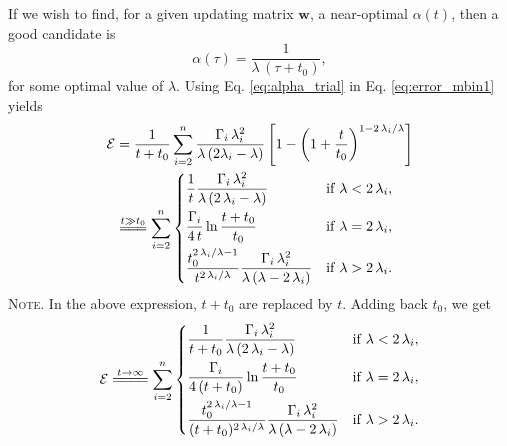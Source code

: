 \documentclass[reprint]{revtex4-1}
\newcommand{\note}[1]{{\color{DarkGreen}\footnotesize \textsc{Note.} #1}}
\begin{document}
If we wish to find,
for a given updating matrix $\mathbf w$,
a near-optimal $\alpha(t)$,
%
then a good candidate is
%
\begin{equation}
\alpha(\tau) = \frac{1}{\lambda \, (\tau + t_0) },
\label{eq:alpha_trial}
\end{equation}
%
for some optimal value of $\lambda$.
%
Using Eq. \eqref{eq:alpha_trial}
in Eq. \eqref{eq:error_mbin1} yields
%
\begin{align}
\mathcal E
&=
\frac{1}{t+t_0}
\sum_{i=2}^n
  \frac{       \Gamma_i \, \lambda_i^2      }
       { \lambda \, (2 \lambda_i - \lambda) }
\left[
  1 - \left(
        1 + \frac{ t }{ t_0 }
      \right)^{1 - 2 \, \lambda_i/\lambda}
\right]
\notag
\\
&\stackrel{      t \gg t_0      }
          { =\joinrel=\joinrel= }
%
\sum_{i = 2}^n
\begin{dcases}
  \frac{ 1 }
       { t }
  \frac{         \Gamma_i \, \lambda_i^2       }
       { \lambda \, (2 \, \lambda_i - \lambda) }
  &
  \mathrm{if \;} \lambda < 2 \, \lambda_i,
  \\%
  \frac{ \Gamma_i }
       {  4 \, t  }
  \ln \frac{ t + t_0 }
           {  t_0    }
  &
  \mathrm{if \;} \lambda = 2 \, \lambda_i,
  \\%
  \frac{ t_0^{ 2 \, \lambda_i / \lambda  - 1 } }
       {   t^{ 2 \, \lambda_i / \lambda      } }
  \frac{      \Gamma_i \, \lambda_i^2          }
       { \lambda \, (\lambda - 2 \, \lambda_i) }
  &
  \mathrm{if \;} \lambda > 2 \, \lambda_i.
\end{dcases}
\label{eq:y2_sum_perfect_invt}
\end{align}
%
\note{In the above expression,
$t + t_0$ are replaced by $t$.
%
Adding back $t_0$, we get
$$
\begin{aligned}
  \mathcal E
  \stackrel{         t \to \infty         }
           { =\joinrel=\joinrel=\joinrel= }
  \sum_{i = 2}^n
  \begin{dcases}
    \frac{    1    }
         { t + t_0 }
    \frac{       \Gamma_i \, \lambda_i^2         }
         { \lambda \, (2 \, \lambda_i - \lambda) }
    &
    \mathrm{if \;} \lambda < 2 \, \lambda_i,
    \\%
    \frac{    \Gamma_i    }
         { 4 \, (t + t_0) }
    \ln \frac{ t + t_0 }
             {   t_0  }
    &
    \mathrm{if \;} \lambda = 2 \, \lambda_i,
    \\
    \frac{  t_0^{ 2 \, \lambda_i / \lambda  - 1}  }
         { (t + t_0)^{ 2 \, \lambda_i / \lambda } }
    \frac{      \Gamma_i \, \lambda_i^2          }
         { \lambda \, (\lambda - 2 \, \lambda_i) }
    &
    \mathrm{if \;} \lambda > 2 \, \lambda_i.
  \end{dcases}
\end{aligned}
$$
}
\end{document}
